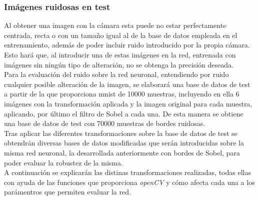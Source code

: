 \subsubsection{Imágenes ruidosas en test}

Al obtener una imagen con la cámara esta puede no estar perfectamente centrada, recta o con un tamaño igual al de la base de datos empleada en el entrenamiento, además de poder incluir ruido introducido por la propia cámara. Esto hará que, al introducir una de estas imágenes en la red, entrenada con imágenes sin ningún tipo de alteración, no se obtenga la precisión deseada.\\

Para la evaluación del ruido sobre la red neuronal, entendiendo por ruido cualquier posible alteración de la imagen, se elaborará una base de datos de test a partir de la que proporciona \acrshort{mnist} de 10000 muestras, incluyendo en ella 6 imágenes con la transformación aplicada y la imagen original para cada muestra, aplicando, por último el filtro de Sobel a cada una. De esta manera se obtiene una base de datos de test con 70000 muestras de bordes ruidosas.\\

Tras aplicar las diferentes transformaciones sobre la base de datos de test se obtendrán diversas bases de datos modificadas que serán introducidas sobre la misma red neuronal, la desarrollada anteriormente con bordes de Sobel, para poder evaluar la robustez de la misma.\\

A continuación se explicarán las distinas transformaciones realizadas, todas ellas con ayuda de las funciones que proporciona \textit{openCV} y cómo afecta cada una a los parámentros que permiten evaluar la red.

